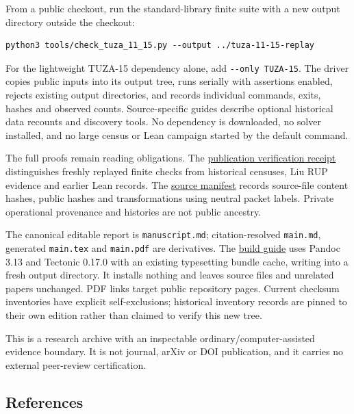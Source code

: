 \documentclass[11pt,a4paper]{article}
\begin{document}
From a public checkout, run the standard-library finite suite with a new output directory outside the checkout:

\begin{verbatim}
python3 tools/check_tuza_11_15.py --output ../tuza-11-15-replay
\end{verbatim}

For the lightweight TUZA-15 dependency alone, add \texttt{-\/-only\ TUZA-15}. The driver copies public inputs into its output tree, runs serially with assertions enabled, rejects existing output directories, and records individual commands, exits, hashes and observed counts. Source-specific guides describe optional historical data recounts and discovery tools. No dependency is downloaded, no solver installed, and no large census or Lean campaign started by the default command.

The full proofs remain reading obligations. The \href{https://github.com/pappa211/ai-math-experiments/blob/main/verification/tuza-11-15/README.md}{publication verification receipt} distinguishes freshly replayed finite checks from historical censuses, Liu RUP evidence and earlier Lean records. The \href{https://github.com/pappa211/ai-math-experiments/blob/main/problems/TUZA-11-15-SOURCE_MANIFEST.json}{source manifest} records source-file content hashes, public hashes and transformations using neutral packet labels. Private operational provenance and histories are not public ancestry.

The canonical editable report is \texttt{manuscript.md}; citation-resolved \texttt{main.md}, generated \texttt{main.tex} and \texttt{main.pdf} are derivatives. The \href{https://github.com/pappa211/ai-math-experiments/blob/main/papers/tuza-11-15-research-summary/README.md}{build guide} uses Pandoc 3.13 and Tectonic 0.17.0 with an existing typesetting bundle cache, writing into a fresh output directory. It installs nothing and leaves source files and unrelated papers unchanged. PDF links target public repository pages. Current checksum inventories have explicit self-exclusions; historical inventory records are pinned to their own edition rather than claimed to verify this new tree.

This is a research archive with an inspectable ordinary/computer-assisted evidence boundary. It is not journal, arXiv or DOI publication, and it carries no external peer-review certification.

\subsection*{References}\label{references}
\end{document}
